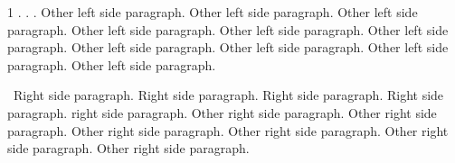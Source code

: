 \documentclass{article}
\begin{document}
\makeatletter

\makeatother

\begin{pages}
    \begin{Leftside}
        \beginnumbering
            \pstart
                  1 
                  {%
                    }%
                    .   .   .
            \pend
            \pstart
                Other left side paragraph.  Other left side paragraph.  Other left side paragraph.  Other left side paragraph.  Other left side paragraph.  Other left side paragraph.  Other left side paragraph.  Other left side paragraph.  Other left side paragraph.  Other left side paragraph.
            \pend
        \endnumbering
    \end{Leftside}
    \begin{Rightside}
        \beginnumbering
            \pstart
                \edtextnow\ Right side paragraph. Right side paragraph. Right side paragraph. Right side paragraph.
            \pend
            \pstart
                 right side paragraph. Other right side paragraph. Other right side paragraph. Other right side paragraph. Other right side paragraph. Other right side paragraph. Other right side paragraph.
            \pend
        \endnumbering
    \end{Rightside}

\end{pages} 
\Pages
\end{document}
